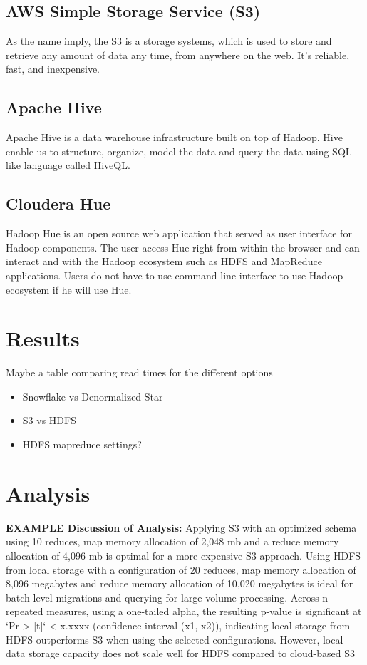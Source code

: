 \documentclass[journal]{IEEEtran}
\begin{document}
\subsection{AWS Simple Storage Service (S3)}

As the name imply, the S3 is a storage systems, which is used to store and retrieve any amount of data any time, from anywhere on the web. It's reliable, fast, and inexpensive.

\subsection{Apache Hive}

Apache Hive is a data warehouse infrastructure built on top of Hadoop. Hive enable us to structure, organize, model the data and query the data using SQL like language called HiveQL.

\subsection{Cloudera Hue}

Hadoop Hue is an open source web application that served as user interface for Hadoop components. The user access Hue right from within the browser and can interact and with the Hadoop ecosystem such as HDFS and MapReduce applications. Users do not have to use command line interface to use Hadoop ecosystem if he will use Hue.

\section{Results}

Maybe a table comparing read times for the different options

\begin{itemize}
	\item Snowflake vs Denormalized Star
	\item S3 vs HDFS
	\item HDFS mapreduce settings?
\end{itemize}

\section{Analysis}

\textbf{EXAMPLE Discussion of Analysis:} Applying S3 with an optimized schema using 10 reduces, map memory allocation of 2,048 mb and a reduce memory allocation of 4,096 mb is optimal for a more expensive S3 approach. Using HDFS from local storage with a configuration of 20 reduces, map memory allocation of 8,096 megabytes and reduce memory allocation of 10,020 megabytes is ideal for batch-level migrations and querying for large-volume processing. Across n repeated measures, using a one-tailed alpha, the resulting p-value is significant at `Pr > |t|` < x.xxxx (confidence interval (x1, x2)), indicating local storage from HDFS outperforms S3 when using the selected configurations. However, local data storage capacity does not scale well for HDFS compared to cloud-based S3
\end{document}

